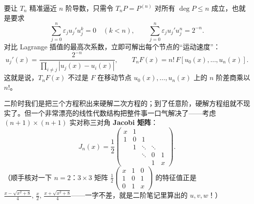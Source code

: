 \documentclass[UTF8,fontset=windows,a4paper,11pt]{ctexart}
\begin{document}
要让 $T_n$ 精准逼近 $n$ 阶导数，只需令 $T_n P=P^{(n)}$ 对所有 $\deg P\le n$ 成立，也就是要求
\[
    \sum_{j=0}^{n}\varepsilon_j u_j' u_j^k = 0\quad (k<n),
    \qquad
    \sum_{j=0}^{n}\varepsilon_j u_j' u_j^n = 2^{-n}.
\]
对比 Lagrange 插值的最高次系数，立即可解出每个节点的“运动速度”：
\begin{equation}
    u_j'(x) = \frac{2^{-n}}{\prod_{i\neq j}|u_j(x)-u_i(x)|},
    \qquad
    T_n F(x) = n!\,F[u_0(x),\dots,u_n(x)].
    \label{eq:ode}
\end{equation}
这就是说，$T_n F(x)$ 不过是 $F$ 在移动节点 $u_0(x),\dots,u_n(x)$ 上的 $n$ 阶差商乘以 $n!$。

二阶时我们是把三个方程积出来硬解二次方程的；到了任意阶，硬解方程组就不现实了。但一个非常漂亮的线性代数结构把整件事一口气解决了——考虑 $(n+1)\times(n+1)$ 实对称三对角 \textbf{Jacobi 矩阵}：
\begin{equation}
    J_n(x) = \frac12
    \begin{pmatrix}
        x & 1 & & & \\
        1 & 0 & 1 & & \\
        & 1 & \ddots & \ddots & \\
        & & \ddots & 0 & 1 \\
        & & & 1 & x
    \end{pmatrix}.
    \label{eq:Jn}
\end{equation}
（顺手核对一下 $n=2$：$3\times 3$ 矩阵 $\frac12\left(\begin{smallmatrix}x&1&0\\1&0&1\\0&1&x\end{smallmatrix}\right)$ 的特征值正是 $\frac{x-\sqrt{x^2+8}}{4},\,\frac{x}{2},\,\frac{x+\sqrt{x^2+8}}{4}$——一字不差，就是二阶笔记里算出的 $u,v,w$！）
\end{document}

